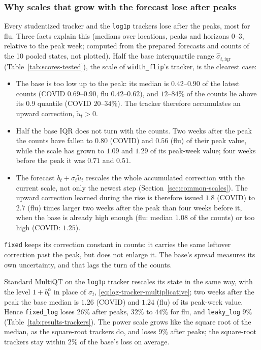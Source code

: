 \documentclass[11pt,a4paper]{article}
\theoremstyle{definition}
\theoremstyle{remark}
\begin{document}
\subsubsection{Why scales that grow with the forecast lose after peaks}
\label{sec:base-width-failure}
Every studentized tracker and the \texttt{log1p} trackers lose after the
peaks, most for flu. Three facts explain this (medians over locations,
peaks and horizons 0--3, relative to the peak week; computed from the
prepared forecasts and counts of the 10 pooled states, not plotted). Half
the base interquartile range $\widehat\sigma_{t,\mathrm{iqr}}$
(Table~\ref{tab:scores-tested}), the scale of \texttt{width\_flip}'s
tracker, is the clearest case:
\begin{itemize}[leftmargin=*,itemsep=3pt]
\item The base is too low up to the peak: its median is $0.42$--$0.90$
of the latest counts (COVID $0.69$--$0.90$, flu $0.42$--$0.62$), and
$12$--$84\%$ of the counts lie above its 0.9 quantile (COVID
$20$--$34\%$). The tracker therefore accumulates an upward correction,
$\tilde u_t>0$.
\item Half the base IQR does not turn with the counts. Two weeks after the
peak the counts have fallen to $0.80$ (COVID) and $0.56$ (flu) of their
peak value, while the scale has grown to $1.09$ and $1.29$ of its
peak-week value; four weeks before the peak it was $0.71$ and $0.51$.
\item The forecast $b_t+\sigma_t\tilde u_t$ rescales the whole
accumulated correction with the current scale, not only the newest step
(Section~\ref{sec:common-scales}). The upward correction learned during
the rise is therefore issued $1.8$ (COVID) to $2.7$ (flu) times larger
two weeks after the peak than four weeks before it, when the base is
already high enough (flu: median $1.08$ of the counts) or too high
(COVID: $1.25$).
\end{itemize}
\texttt{fixed} keeps its correction constant in counts: it carries the
same leftover correction past the peak, but does not enlarge it. The
base's spread measures its own uncertainty, and that lags the turn of the
counts.

Standard MultiQT on the \texttt{log1p} tracker rescales its state in the
same way, with the level $1+b_t^\alpha$ in place of $\sigma_t$,
\eqref{eq:log-tracker-multiplicative}; two weeks after the peak the base
median is $1.26$ (COVID) and $1.24$ (flu) of its peak-week value. Hence
\texttt{fixed\_log} loses $26\%$ after peaks, $32\%$ to $44\%$ for flu, and
\texttt{leaky\_log} $9\%$ (Table~\ref{tab:results-trackers}). The power
scale grows like the square root of the median, as the square-root
trackers do, and loses $9\%$ after peaks; the square-root trackers stay
within $2\%$ of the base's loss on average.
\end{document}
